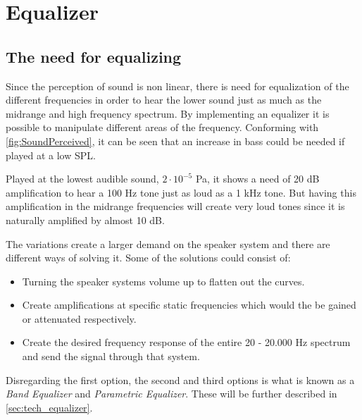 \section{Equalizer}\label{sec:tech_equalizer}
\subsection{The need for equalizing}

Since the perception of sound is non linear, there is need for equalization of the different frequencies in order to hear the lower sound just as much as the midrange and high frequency spectrum. By implementing an equalizer it is possible to manipulate different areas of the frequency. Conforming with \autoref{fig:SoundPerceived}, it can be seen that an increase in bass could be needed if played at a low \gls{SPL}.

Played at the lowest audible sound, $2\cdot 10^{-5}$ Pa, it shows a need of 20 dB amplification to hear a 100 Hz tone just as loud as a 1 kHz tone. But having this amplification in the midrange frequencies will create very loud tones since it is naturally amplified by almost 10 dB. 

The variations create a larger demand on the speaker system and there are different ways of solving it. Some of the solutions could consist of:

\begin{itemize}
\item Turning the speaker systems volume up to flatten out the curves.
\item Create amplifications at specific static frequencies which would the be gained or attenuated respectively.
\item Create the desired frequency response of the entire 20 - 20.000 Hz spectrum and send the signal through that system.
\end{itemize} 

Disregarding the first option, the second and third options is what is known as a \textit{Band Equalizer} and \textit{Parametric Equalizer}. These will be further described in \autoref{sec:tech_equalizer}.
